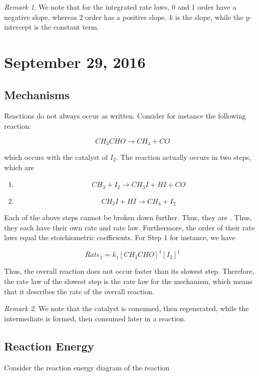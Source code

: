 \documentclass[11pt]{article}
\theoremstyle{plain} %
\theoremstyle{definition}
\theoremstyle{example}
\theoremstyle{remark}
\newtheorem*{remark}{Remark}
\begin{document}
\begin{remark}
We note that for the integrated rate laws, $0$ and $1$ order have a negative slope, whereas $2$ order has a positive slope. $k$ is the slope, while the $y$-intercept is the constant term.
\end{remark}


\section{September 29, 2016}
\subsection{Mechanisms}

Reactions do not always occur as written. Consider for instance the following reaction:

$$CH_3CHO \rightarrow CH_4+CO$$

which occurs with the catalyst of $I_2$. The reaction actually occurs in two steps, which are

\begin{enumerate}
\item $$CH_3+I_2 \rightarrow CH_3I + HI + CO$$
\item $$CH_3I + HI \rightarrow CH_4+I_2$$
\end{enumerate}



Each of the above steps cannot be broken down further. Thus, they are . Thus, they each have their own rate and rate law. Furthermore, the order of their rate laws equal the stoichiometric coefficients. For Step 1 for instance, we have

$$Rate_{1} = k_1[CH_3CHO]^1[I_2]^1$$

Thus, the overall reaction does not occur faster than its slowest step. Therefore, the rate law of the slowest step is the rate law for the mechanism, which means that it describes the rate of the overall reaction.
\begin{remark}
We note that the catalyst is consumed, then regenerated, while the intermediate is formed, then consumed later in a reaction.
\end{remark}

\subsection{Reaction Energy}
Consider the reaction energy diagram of the reaction
\end{document}
